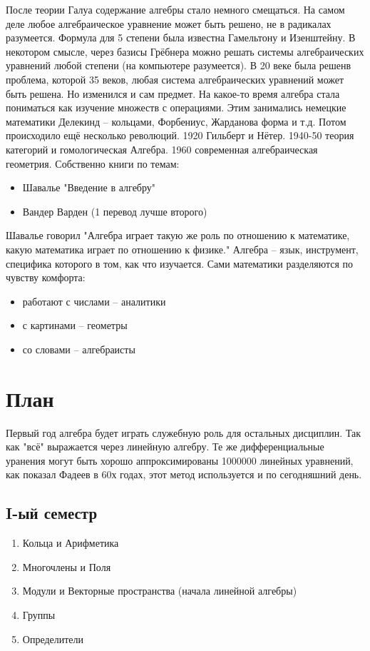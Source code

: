\documentclass{book}
\begin{document}
После теории Галуа содержание алгебры стало немного смещаться. На самом деле
любое алгебраическое уравнение может быть решено, не в радикалах разумеется.
Формула для 5 степени была известна Гамельтону и Изенштейну. В некотором
смысле, через базисы Грёбнера можно решать системы алгебраических уравнений
любой степени (на компьютере разумеется). В 20 веке была решенв проблема,
которой 35 веков, любая система алгебраических уравнений может быть решена.
Но изменился и сам предмет. На какое-то время алгебра стала пониматься как
изучение множеств с операциями. Этим занимались немецкие математики Делекинд
– кольцами, Форбениус, Жарданова форма и т.д. Потом происходило ещё несколько
революций. 1920 Гильберт и Нётер. 1940-50 теория категорий и гомологическая
Алгебра. 1960 современная алгебраическая геометрия. Собственно книги по темам:
\begin{itemize}
    \item Шавалье "Введение в алгебру"
    \item Вандер Варден (1 перевод лучше второго)
\end{itemize}
Шавалье говорил "Алгебра играет такую же роль по отношению к математике,
какую математика играет по отношению к физике." Алгебра – язык, инструмент,
специфика которого в том, как что изучается. Сами математики разделяются по
чувству комфорта:
\begin{itemize}
    \item работают с числами – аналитики
    \item с картинами – геометры
    \item со словами – алгебраисты
\end{itemize}
\section{План}
Первый год алгебра будет играть служебную роль для остальных дисциплин. Так
как "всё" выражается через линейную алгебру. Те же дифференциальные уранения
могут быть хорошо аппроксимированы 1000000 линейных уравнений, как показал
Фадеев в 60х годах, этот метод используется и по сегодняшний день.
\subsection{I-ый семестр}
\begin{enumerate}
    \item Кольца и Арифметика
    \item Многочлены и Поля
    \item Модули и Векторные пространства (начала линейной алгебры)
    \item Группы
    \item Определители
\end{enumerate}
\end{document}
